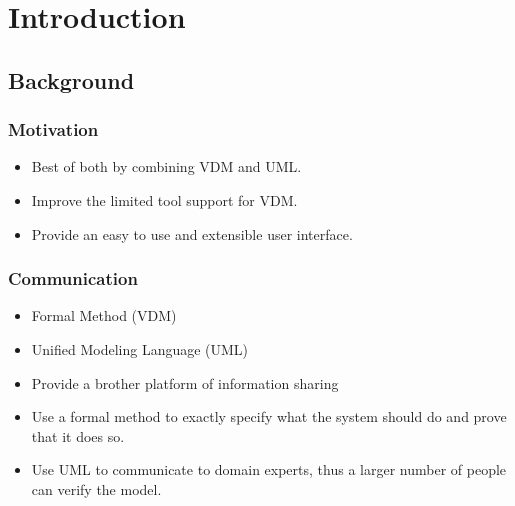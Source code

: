 %
%
\section{Introduction}

\subsection{Background}

%
%
\frame
{
 \frametitle{Motivation}
  \begin{itemize}[<+->]
\itemsep=1cm
  \item<1-> Best of both by combining VDM and UML.
  \item<2-> Improve the limited tool support for VDM.
  \item<3-> Provide an easy to use and extensible user interface.
  \end{itemize}
}

%
%
\frame
{
\frametitle{Communication}
  \begin{itemize}
	\itemsep=1cm
  		\item<1-> Formal Method (VDM)
  		\item<2-> Unified Modeling Language (UML)
  		\item<3-> Provide a brother platform of information sharing
  \end{itemize}

}

\note
{

  \begin{itemize}
  		\item Use a formal method to exactly specify what the system should do and prove that it does so.
  		\item Use UML to communicate to domain experts, thus a larger number of people can verify the model.
  		
  \end{itemize}



}

